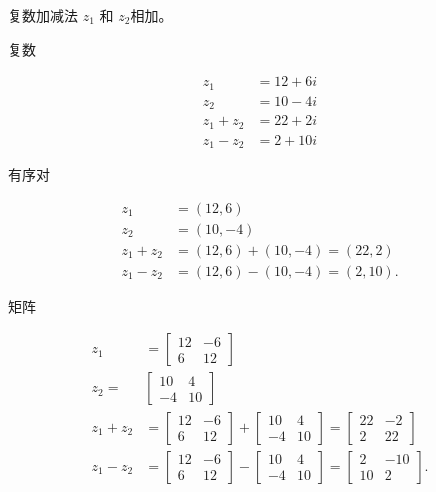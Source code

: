 \begin{Li}
复数加减法
$z_{1}$ 和 $z_{2}$相加。

复数

$$
\begin{aligned}
z_{1} & =12+6 i \\
z_{2} & =10-4 i \\
z_{1}+z_{2} & =22+2 i \\
z_{1}-z_{2} & =2+10 i
\end{aligned}
$$

有序对

$$
\begin{aligned}
z_{1} & =(12,6) \\
z_{2} & =(10,-4) \\
z_{1}+z_{2} & =(12,6)+(10,-4)=(22,2) \\
z_{1}-z_{2} & =(12,6)-(10,-4)=(2,10) .
\end{aligned}
$$

矩阵

$$
\begin{aligned}
z_{1} & =\left[\begin{array}{cc}
12 & -6 \\
6 & 12
\end{array}\right] \\
z_{2}= & {\left[\begin{array}{cc}
10 & 4 \\
-4 & 10
\end{array}\right] } \\
z_{1}+z_{2} & =\left[\begin{array}{cc}
12 & -6 \\
6 & 12
\end{array}\right]+\left[\begin{array}{cc}
10 & 4 \\
-4 & 10
\end{array}\right]=\left[\begin{array}{cc}
22 & -2 \\
2 & 22
\end{array}\right] \\
z_{1}-z_{2} & =\left[\begin{array}{cc}
12 & -6 \\
6 & 12
\end{array}\right]-\left[\begin{array}{cc}
10 & 4 \\
-4 & 10
\end{array}\right]=\left[\begin{array}{cc}
2 & -10 \\
10 & 2
\end{array}\right] .
\end{aligned}
$$

\end{Li}

